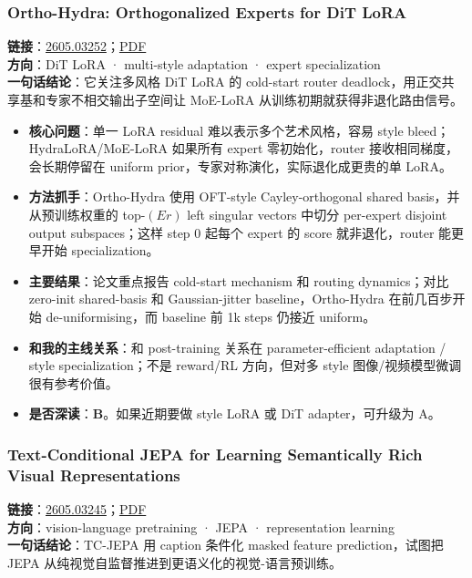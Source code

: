 \subsubsection{Ortho-Hydra: Orthogonalized Experts for DiT LoRA}

\textbf{链接}：\href{https://arxiv.org/abs/2605.03252}{2605.03252}；\href{https://arxiv.org/pdf/2605.03252}{PDF}\\
\textbf{方向}：DiT LoRA · multi-style adaptation · expert specialization\\
\textbf{一句话结论}：它关注多风格 DiT LoRA 的 cold-start router deadlock，用正交共享基和专家不相交输出子空间让 MoE-LoRA 从训练初期就获得非退化路由信号。

\begin{itemize}[leftmargin=1.5em]
  \item \textbf{核心问题}：单一 LoRA residual 难以表示多个艺术风格，容易 style bleed；HydraLoRA/MoE-LoRA 如果所有 expert 零初始化，router 接收相同梯度，会长期停留在 uniform prior，专家对称演化，实际退化成更贵的单 LoRA。
  \item \textbf{方法抓手}：Ortho-Hydra 使用 OFT-style Cayley-orthogonal shared basis，并从预训练权重的 top-\((Er)\) left singular vectors 中切分 per-expert disjoint output subspaces；这样 step 0 起每个 expert 的 score 就非退化，router 能更早开始 specialization。
  \item \textbf{主要结果}：论文重点报告 cold-start mechanism 和 routing dynamics；对比 zero-init shared-basis 和 Gaussian-jitter baseline，Ortho-Hydra 在前几百步开始 de-uniformising，而 baseline 前 1k steps 仍接近 uniform。
  \item \textbf{和我的主线关系}：和 post-training 关系在 parameter-efficient adaptation / style specialization；不是 reward/RL 方向，但对多 style 图像/视频模型微调很有参考价值。
  \item \textbf{是否深读}：\textbf{B}。如果近期要做 style LoRA 或 DiT adapter，可升级为 A。
\end{itemize}

\subsubsection{Text-Conditional JEPA for Learning Semantically Rich Visual Representations}

\textbf{链接}：\href{https://arxiv.org/abs/2605.03245}{2605.03245}；\href{https://arxiv.org/pdf/2605.03245}{PDF}\\
\textbf{方向}：vision-language pretraining · JEPA · representation learning\\
\textbf{一句话结论}：TC-JEPA 用 caption 条件化 masked feature prediction，试图把 JEPA 从纯视觉自监督推进到更语义化的视觉-语言预训练。

